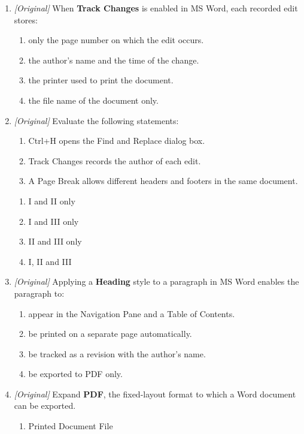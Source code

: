 \documentclass[11pt]{article}
\begin{document}
\begin{enumerate}[label=\textbf{Q\arabic*.}, leftmargin=*]
\begin{enumerate}[label=\Alph*.]
  \end{enumerate}
\item \textit{[Original]} When \textbf{Track Changes} is enabled in MS Word,
  each recorded edit stores:
  \begin{enumerate}[label=\Alph*.]
    \item only the page number on which the edit occurs.
    \item the author's name and the time of the change.
    \item the printer used to print the document.
    \item the file name of the document only.
  \end{enumerate}
\item \textit{[Original]} Evaluate the following statements:
  \begin{enumerate}[label=\Roman*.]
    \item Ctrl+H opens the Find and Replace dialog box.
    \item Track Changes records the author of each edit.
    \item A Page Break allows different headers and footers in the same
      document.
  \end{enumerate}
  \begin{enumerate}[label=\Alph*.]
    \item I and II only
    \item I and III only
    \item II and III only
    \item I, II and III
  \end{enumerate}
\item \textit{[Original]} Applying a \textbf{Heading} style to a paragraph in
  MS Word enables the paragraph to:
  \begin{enumerate}[label=\Alph*.]
    \item appear in the Navigation Pane and a Table of Contents.
    \item be printed on a separate page automatically.
    \item be tracked as a revision with the author's name.
    \item be exported to PDF only.
  \end{enumerate}
\item \textit{[Original]} Expand \textbf{PDF}, the fixed-layout format to which
  a Word document can be exported.
  \begin{enumerate}[label=\Alph*.]
    \item Printed Document File

\end{enumerate}
\end{enumerate}
\end{document}
